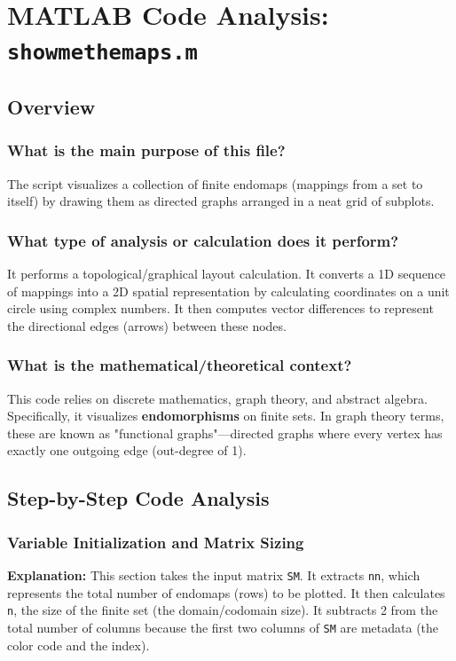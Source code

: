 
\chapter{MATLAB Code Analysis: \texttt{showmethemaps.m}}
\date{}


\maketitle

\section{Overview}

\subsection*{What is the main purpose of this file?}
The script visualizes a collection of finite endomaps (mappings from a set to itself) by drawing them as directed graphs arranged in a neat grid of subplots.

\subsection*{What type of analysis or calculation does it perform?}
It performs a topological/graphical layout calculation. It converts a 1D sequence of mappings into a 2D spatial representation by calculating coordinates on a unit circle using complex numbers. It then computes vector differences to represent the directional edges (arrows) between these nodes.

\subsection*{What is the mathematical/theoretical context?}
This code relies on discrete mathematics, graph theory, and abstract algebra. Specifically, it visualizes \textbf{endomorphisms} on finite sets. In graph theory terms, these are known as "functional graphs"—directed graphs where every vertex has exactly one outgoing edge (out-degree of 1).

\section{Step-by-Step Code Analysis}

\subsection{Variable Initialization and Matrix Sizing}
\textbf{Explanation:} This section takes the input matrix \texttt{SM}. It extracts \texttt{nn}, which represents the total number of endomaps (rows) to be plotted. It then calculates \texttt{n}, the size of the finite set (the domain/codomain size). It subtracts 2 from the total number of columns because the first two columns of \texttt{SM} are metadata (the color code and the index).

